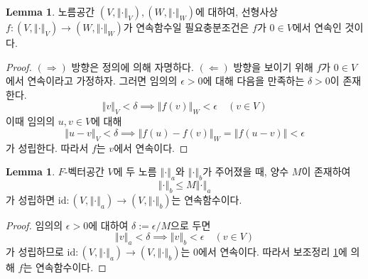 \documentclass[11pt]{book}
\numberwithin{equation}{chapter}
\def\eps{\epsilon}
\def\id{\text{id}}
\newcommand{\norm}[1]{\left\Vert#1\right\Vert}
\theoremstyle{definition}
\newtheorem{lem}[thm]{Lemma}
\begin{document}
\begin{lem} \label{lem 7.2.7}
    노름공간 \((V, \norm{\cdot}_V), (W, \norm{\cdot}_W)\)에 대하여, 선형사상 \(f : (V, \norm{\cdot}_V) \to (W, \norm{\cdot}_W)\)가 연속함수일 필요충분조건은 \(f\)가 \(0 \in V\)에서 연속인 것이다.
\end{lem}
\begin{proof}
    \((\Rightarrow)\) 방향은 정의에 의해 자명하다. \((\Leftarrow)\) 방향을 보이기 위해 \(f\)가 \(0 \in V\)에서 연속이라고 가정하자. 그러면 임의의 \(\eps > 0\)에 대해 다음을 만족하는 \(\delta > 0\)이 존재한다.
    \[
    \norm{v}_V < \delta \implies \norm{f(v)}_W < \eps \quad (v \in V)    
    \]
    이때 임의의 \(u, v \in V\)에 대해
    \[
        \norm{u - v}_V < \delta \implies \norm{f(u) - f(v)}_W = \norm{f(u - v)}< \eps
    \]
    가 성립한다. 따라서 \(f\)는 \(v\)에서 연속이다.
\end{proof}

\begin{lem} \label{lem 7.2.8}
    \(F\)-벡터공간 \(V\)에 두 노름 \(\norm{\cdot}_a\)와 \(\norm{\cdot}_b\)가 주어졌을 때, 양수 \(M\)이 존재하여
    \[
        \norm{\cdot}_b \le M \norm{\cdot}_a
    \]
    가 성립하면 \(\id : (V, \norm{\cdot}_a) \to (V, \norm{\cdot}_b)\)는 연속함수이다.
\end{lem}
\begin{proof}
    임의의 \(\eps > 0\)에 대하여 \(\delta := \eps / M\)으로 두면
    \[
    \norm{v}_a < \delta \implies \norm{v}_b < \eps \quad (v \in V)
    \]
    가 성립하므로 \(\id : (V, \norm{\cdot}_a) \to (V, \norm{\cdot}_b)\)는 0에서 연속이다. 따라서 보조정리 \ref{lem 7.2.7}에 의해 \(f\)는 연속함수이다.
\end{proof}
\end{document}

